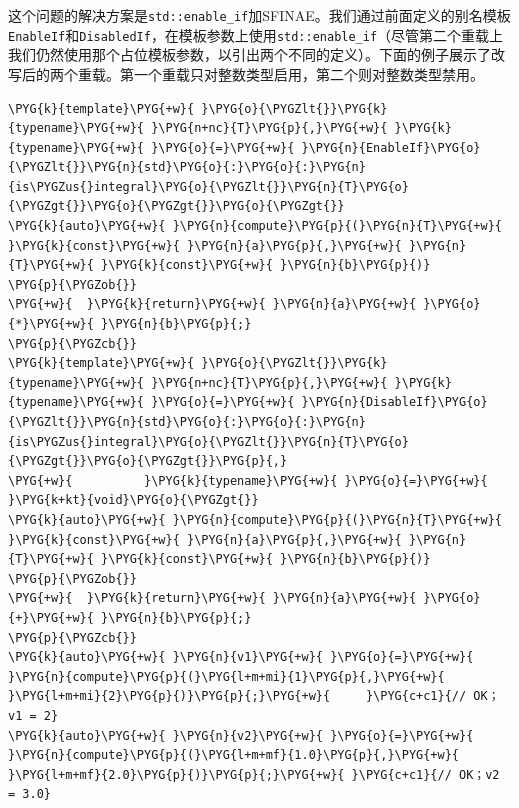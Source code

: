 
这个问题的解决方案是\texttt{std::\allowbreak{}enable\_\allowbreak{}if}加SFINAE。我们通过前面定义的别名模板\texttt{EnableIf}和\texttt{DisabledIf}，在模板参数上使用\texttt{std::\allowbreak{}enable\_\allowbreak{}if}（尽管第二个重载上我们仍然使用那个占位模板参数，以引出两个不同的定义）。下面的例子展示了改写后的两个重载。第一个重载只对整数类型启用，第二个则对整数类型禁用。



\begin{codeblockbg}
\begin{Verbatim}[commandchars=\\\{\},breaklines=true,breakanywhere=true,fontsize=\codefont,xleftmargin=17bp]
\PYG{k}{template}\PYG{+w}{ }\PYG{o}{\PYGZlt{}}\PYG{k}{typename}\PYG{+w}{ }\PYG{n+nc}{T}\PYG{p}{,}\PYG{+w}{ }\PYG{k}{typename}\PYG{+w}{ }\PYG{o}{=}\PYG{+w}{ }\PYG{n}{EnableIf}\PYG{o}{\PYGZlt{}}\PYG{n}{std}\PYG{o}{:}\PYG{o}{:}\PYG{n}{is\PYGZus{}integral}\PYG{o}{\PYGZlt{}}\PYG{n}{T}\PYG{o}{\PYGZgt{}}\PYG{o}{\PYGZgt{}}\PYG{o}{\PYGZgt{}}
\PYG{k}{auto}\PYG{+w}{ }\PYG{n}{compute}\PYG{p}{(}\PYG{n}{T}\PYG{+w}{ }\PYG{k}{const}\PYG{+w}{ }\PYG{n}{a}\PYG{p}{,}\PYG{+w}{ }\PYG{n}{T}\PYG{+w}{ }\PYG{k}{const}\PYG{+w}{ }\PYG{n}{b}\PYG{p}{)}
\PYG{p}{\PYGZob{}}
\PYG{+w}{  }\PYG{k}{return}\PYG{+w}{ }\PYG{n}{a}\PYG{+w}{ }\PYG{o}{*}\PYG{+w}{ }\PYG{n}{b}\PYG{p}{;}
\PYG{p}{\PYGZcb{}}
\PYG{k}{template}\PYG{+w}{ }\PYG{o}{\PYGZlt{}}\PYG{k}{typename}\PYG{+w}{ }\PYG{n+nc}{T}\PYG{p}{,}\PYG{+w}{ }\PYG{k}{typename}\PYG{+w}{ }\PYG{o}{=}\PYG{+w}{ }\PYG{n}{DisableIf}\PYG{o}{\PYGZlt{}}\PYG{n}{std}\PYG{o}{:}\PYG{o}{:}\PYG{n}{is\PYGZus{}integral}\PYG{o}{\PYGZlt{}}\PYG{n}{T}\PYG{o}{\PYGZgt{}}\PYG{o}{\PYGZgt{}}\PYG{p}{,}
\PYG{+w}{          }\PYG{k}{typename}\PYG{+w}{ }\PYG{o}{=}\PYG{+w}{ }\PYG{k+kt}{void}\PYG{o}{\PYGZgt{}}
\PYG{k}{auto}\PYG{+w}{ }\PYG{n}{compute}\PYG{p}{(}\PYG{n}{T}\PYG{+w}{ }\PYG{k}{const}\PYG{+w}{ }\PYG{n}{a}\PYG{p}{,}\PYG{+w}{ }\PYG{n}{T}\PYG{+w}{ }\PYG{k}{const}\PYG{+w}{ }\PYG{n}{b}\PYG{p}{)}
\PYG{p}{\PYGZob{}}
\PYG{+w}{  }\PYG{k}{return}\PYG{+w}{ }\PYG{n}{a}\PYG{+w}{ }\PYG{o}{+}\PYG{+w}{ }\PYG{n}{b}\PYG{p}{;}
\PYG{p}{\PYGZcb{}}
\PYG{k}{auto}\PYG{+w}{ }\PYG{n}{v1}\PYG{+w}{ }\PYG{o}{=}\PYG{+w}{ }\PYG{n}{compute}\PYG{p}{(}\PYG{l+m+mi}{1}\PYG{p}{,}\PYG{+w}{ }\PYG{l+m+mi}{2}\PYG{p}{)}\PYG{p}{;}\PYG{+w}{     }\PYG{c+c1}{// OK；v1 = 2}
\PYG{k}{auto}\PYG{+w}{ }\PYG{n}{v2}\PYG{+w}{ }\PYG{o}{=}\PYG{+w}{ }\PYG{n}{compute}\PYG{p}{(}\PYG{l+m+mf}{1.0}\PYG{p}{,}\PYG{+w}{ }\PYG{l+m+mf}{2.0}\PYG{p}{)}\PYG{p}{;}\PYG{+w}{ }\PYG{c+c1}{// OK；v2 = 3.0}
\end{Verbatim}
\end{codeblockbg}


